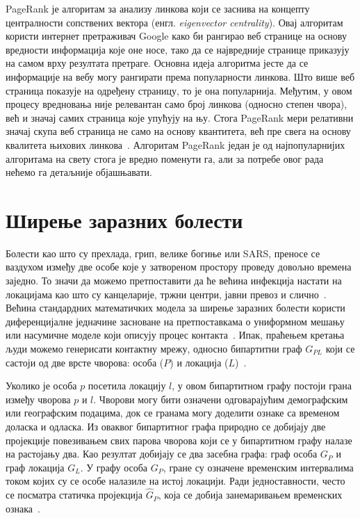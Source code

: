 PageRank је алгоритам за анализу линкова који се заснива на концепту централности сопствених вектора (енгл. \textit{eigenvector centrality}). Овај алгоритам користи интернет претраживач Google како би рангирао веб странице на основу вредности информација које оне носе, тако да се највредније странице приказују на самом врху резултата претраге. Основна идеја алгоритма јесте да се информације на вебу могу рангирати према популарности линкова. Што више веб страница показује на одређену страницу, то је она популарнија. Међутим, у овом процесу вредновања није релевантан само број линкова (односно степен чвора), већ и значај самих страница које упућују на њу. Стога PageRank мери релативни значај скупа веб страница не само на основу квантитета, већ пре свега на основу квалитета њихових линкова~\cite{boldiWebgraphFrameworkCompression2004}. Алгоритам PageRank један је од најпопуларнијих алгоритама на свету стога је вредно поменути га, али за потребе овог рада нећемо га детаљније објашњавати.

\section{Ширење заразних болести}

Болести као што су прехлада, грип, велике богиње или SARS, преносе се ваздухом између две особе које у затвореном простору проведу довољно времена заједно. То значи да можемо претпоставити да ће већина инфекција настати на локацијама као што су канцеларије, тржни центри, јавни превоз и слично~\cite{toroczkaiProximityNetworksEpidemics2007}. Већина стандардних математичких модела за ширење заразних болести користи диференцијалне једначине засноване на претпоставкама о униформном мешању или насумичне моделе који описују процес контакта~\cite{eubankModellingDiseaseOutbreaks2004}. Ипак, праћењем кретања људи можемо генерисати контактну мрежу, односно бипартитни граф $G_{PL}$ који се састоји од две врсте чворова: особа ($P$) и локација ($L$)~\cite{toroczkaiProximityNetworksEpidemics2007, eubankModellingDiseaseOutbreaks2004}. 

Уколико је особа $p$ посетила локацију $l$, у овом бипартитном графу постоји грана између чворова $p$ и $l$. Чворови могу бити означени одговарајућим демографским или географским подацима, док се гранама могу доделити ознаке са временом доласка и одласка. Из оваквог бипартитног графа природно се добијају две пројекције повезивањем свих парова чворова који се у бипартитном графу налазе на растојању два. Као резултат добијају се два засебна графа: граф особа $G_P$ и граф локација $G_L$. У графу особа $G_P$, гране су означене временским интервалима током којих су се особе налазиле на истој локацији. Ради једноставности, често се посматра статичка пројекција $\hat{G}_P$, која се добија занемаривањем временских ознака~\cite{eubankModellingDiseaseOutbreaks2004}.

